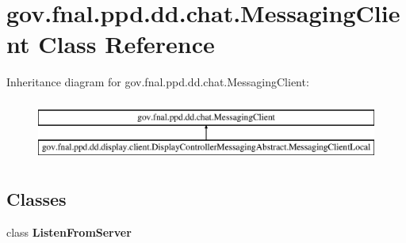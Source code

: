 \hypertarget{classgov_1_1fnal_1_1ppd_1_1dd_1_1chat_1_1MessagingClient}{\section{gov.\-fnal.\-ppd.\-dd.\-chat.\-Messaging\-Client Class Reference}
\label{classgov_1_1fnal_1_1ppd_1_1dd_1_1chat_1_1MessagingClient}
}
Inheritance diagram for gov.\-fnal.\-ppd.\-dd.\-chat.\-Messaging\-Client\-:\begin{figure}[H]
\begin{center}
\leavevmode
\includegraphics[height=2.000000cm]{classgov_1_1fnal_1_1ppd_1_1dd_1_1chat_1_1MessagingClient}
\end{center}
\end{figure}
\subsection*{Classes}
\begin{DoxyCompactItemize}
\item 
class {\bfseries Listen\-From\-Server}
\end{DoxyCompactItemize}
